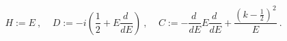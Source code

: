 \begin{equation}
H := E \:,\:\:\:\:\:
D := -i\left(\frac{1}{2} + E\frac{d \:}{d E}\right)\:, \:\:\:\:\:
C := -\frac{d \:}{d E} E\frac{d \:}{d E} +
\frac{(k-\frac{1}{2})^2}{E}\:.\label{ge3F}  
\end{equation} 
